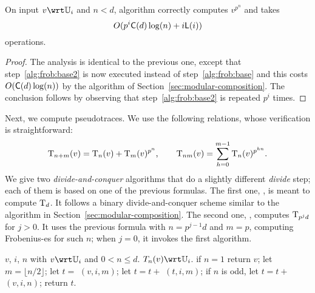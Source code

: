 \begin{theorem}
  \label{th:l-ifrob}
  On input $v\wrt\U_i$ and $n<d$, algorithm 
  correctly computes $v^{p^n}$ and takes 
  \begin{equation}
    \label{eq:94}
    O(p^i\mathsf{C}(d)\log (n) + i\mathsf{L}(i))
  \end{equation}
  operations.
\end{theorem}
\begin{proof}
  The analysis is identical to the previous one, except that
  step~\ref{alg:frob:base2} is now executed instead of
  step~\ref{alg:frob:base} and this costs $O(\mathsf{C}(d)\log (n))$ by
  the algorithm of Section~\ref{sec:modular-composition}. The
  conclusion follows by observing that step~\ref{alg:frob:base2} is
  repeated $p^i$ times.
\end{proof}

Next, we compute pseudotraces. We use the following relations, whose
verification is straightforward:
\begin{equation}
  \operatorname{T}_{n+m}(v) =
  \operatorname{T}_{n}(v) + \operatorname{T}_{m}(v)^{p^n}
  \text{,}\qquad
  \operatorname{T}_{nm}(v) =
  \sum_{h=0}^{m-1}\operatorname{T}_{n}(v)^{p^{hn}}
  \text{.}
\end{equation}
We give two \emph{divide-and-conquer} algorithms that do a slightly
different \emph{divide} step; each of them is based on one of the
previous formulas. The first one, , is meant to
compute $\operatorname{T}_d$. It follows a binary divide-and-conquer scheme
similar to the algorithm in Section~\ref{sec:modular-composition}. The
second one, , 
computes $\operatorname{T}_{p^jd}$ for $j>0$. It
uses the previous formula with $n=p^{j-1}d$ and $m=p$, computing
Frobenius-es for such $n$; when $j=0$, it invokes the first algorithm.


\begin{algorithm}
  \caption{}
  \label{alg:littlepseudotrace}
  \begin{algorithmic}[1]
    \REQUIRE $v$, $i$, $n$ with $v\wrt\U_i$ and $0<n\le d$.
    \ENSURE $T_{n}(v) \wrt \U_i$.
    \STATE \label{alg:lpseudo:base} if $n = 1$ return $v$;
    \STATE \label{alg:lpseudo:half} let $m = \lfloor n/2 \rfloor$;
    \STATE \label{alg:lpseudo:rec} let $t=$ $(v,i,m)$;
    \STATE \label{alg:lpseudo:frob} let $t=t+$ $(t, i, m)$;
    \STATE \label{alg:lpseudo:odd} if $n$ is odd, let $t=t+$ $(v, i, n)$;
    \STATE return $t$.
  \end{algorithmic}
\end{algorithm}

